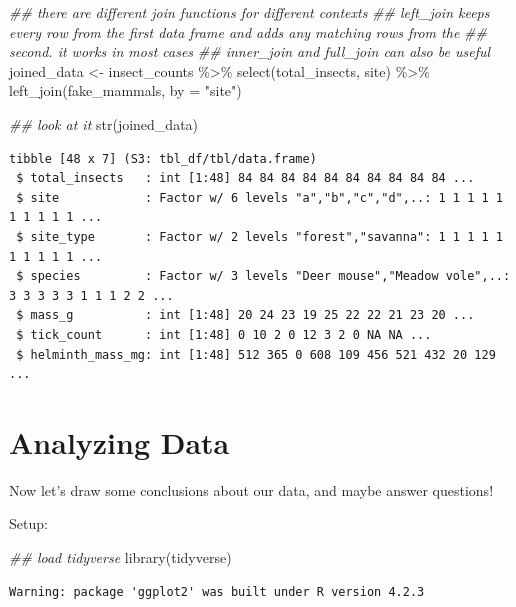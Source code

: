 \documentclass[
  letterpaper,
  DIV=11,
  numbers=noendperiod]{scrreprt}
\newenvironment{Shaded}{\begin{snugshade}}{\end{snugshade}}
\newcommand{\AttributeTok}[1]{\textcolor[rgb]{0.40,0.45,0.13}{#1}}
\newcommand{\DocumentationTok}[1]{\textcolor[rgb]{0.37,0.37,0.37}{\textit{#1}}}
\newcommand{\FunctionTok}[1]{\textcolor[rgb]{0.28,0.35,0.67}{#1}}
\newcommand{\NormalTok}[1]{\textcolor[rgb]{0.00,0.23,0.31}{#1}}
\newcommand{\OtherTok}[1]{\textcolor[rgb]{0.00,0.23,0.31}{#1}}
\newcommand{\SpecialCharTok}[1]{\textcolor[rgb]{0.37,0.37,0.37}{#1}}
\newcommand{\StringTok}[1]{\textcolor[rgb]{0.13,0.47,0.30}{#1}}
\begin{document}
\begin{Shaded}
\begin{Highlighting}[]
\DocumentationTok{\#\# there are different join functions for different contexts}
\DocumentationTok{\#\# left\_join keeps every row from the first data frame and adds any matching rows from the}
\DocumentationTok{\#\# second. it works in most cases}
\DocumentationTok{\#\# inner\_join and full\_join can also be useful}
\NormalTok{joined\_data }\OtherTok{\textless{}{-}}\NormalTok{ insect\_counts }\SpecialCharTok{\%\textgreater{}\%}
  \FunctionTok{select}\NormalTok{(total\_insects, site) }\SpecialCharTok{\%\textgreater{}\%}
  \FunctionTok{left\_join}\NormalTok{(fake\_mammals, }\AttributeTok{by =} \StringTok{"site"}\NormalTok{)}

\DocumentationTok{\#\# look at it}
\FunctionTok{str}\NormalTok{(joined\_data)}
\end{Highlighting}
\end{Shaded}

\begin{verbatim}
tibble [48 x 7] (S3: tbl_df/tbl/data.frame)
 $ total_insects   : int [1:48] 84 84 84 84 84 84 84 84 84 84 ...
 $ site            : Factor w/ 6 levels "a","b","c","d",..: 1 1 1 1 1 1 1 1 1 1 ...
 $ site_type       : Factor w/ 2 levels "forest","savanna": 1 1 1 1 1 1 1 1 1 1 ...
 $ species         : Factor w/ 3 levels "Deer mouse","Meadow vole",..: 3 3 3 3 3 1 1 1 2 2 ...
 $ mass_g          : int [1:48] 20 24 23 19 25 22 22 21 23 20 ...
 $ tick_count      : int [1:48] 0 10 2 0 12 3 2 0 NA NA ...
 $ helminth_mass_mg: int [1:48] 512 365 0 608 109 456 521 432 20 129 ...
\end{verbatim}

\chapter{Analyzing Data}\label{analyzing-data}

Now let's draw some conclusions about our data, and maybe answer
questions!

Setup:

\begin{Shaded}
\begin{Highlighting}[]
\DocumentationTok{\#\# load tidyverse}
\FunctionTok{library}\NormalTok{(tidyverse)}
\end{Highlighting}
\end{Shaded}

\begin{verbatim}
Warning: package 'ggplot2' was built under R version 4.2.3
\end{verbatim}
\end{document}
